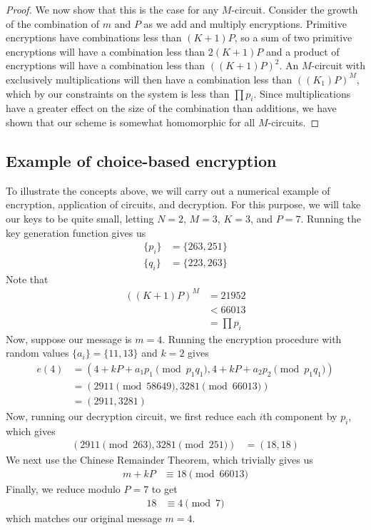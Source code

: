 \documentclass[11pt]{report}
\begin{document}
\begin{proof}
We now show that this is the case for any $M$-circuit. Consider the growth of the combination of $m$ and $P$ as we add and multiply encryptions. Primitive encryptions have combinations less than $(K+1)P$, so a sum of two primitive encryptions will have a combination less than $2(K+1)P$ and a product of encryptions will have a combination less than $((K+1)P)^2$. An $M$-circuit with exclusively multiplications will then have a combination less than $((K_1)P)^M$, which by our constraints on the system is less than $\prod p_i$. Since multiplications have a greater effect on the size of the combination than additions, we have shown that our scheme is somewhat homomorphic for all $M$-circuits.

\end{proof}


\subsection{Example of choice-based encryption}

To illustrate the concepts above, we will carry out a numerical example of encryption, application of circuits, and decryption. For this purpose, we will take our keys to be quite small, letting $N=2$, $M=3$, $K=3$, and $P=7$. Running the key generation function gives us
\begin{align*}
\{p_i\} &= \{263,251\}\\
\{q_i\} &= \{223,263\}
\end{align*}
Note that
\begin{align*}
((K+1)P)^M &= 21952\\
&< 66013\\
&= \prod p_i
\end{align*}
Now, suppose our message is $m=4$. Running the encryption procedure with random values $\{a_i\} = \{11,13\}$ and $k=2$ gives
\begin{align*}
e(4) &= (4+kP+a_1p_1 \pmod{p_1q_1},4+kP+a_2p_2\pmod{p_1q_1}) \\
&= (2911 \pmod{58649}, 3281 \pmod{66013})\\
&= (2911, 3281)
\end{align*}
Now, running our decryption circuit, we first reduce each $i$th component by $p_i$, which gives
\begin{align*}
(2911 \pmod{263}, 3281 \pmod{251}) &= (18,18)
\end{align*}
We next use the Chinese Remainder Theorem, which trivially gives us
\begin{align*}
m+kP &\equiv 18 \pmod{66013}
\end{align*}
Finally, we reduce modulo $P=7$ to get
\begin{align*}
18 &\equiv 4 \pmod{7}
\end{align*}
which matches our original message $m=4$.
\end{document}
